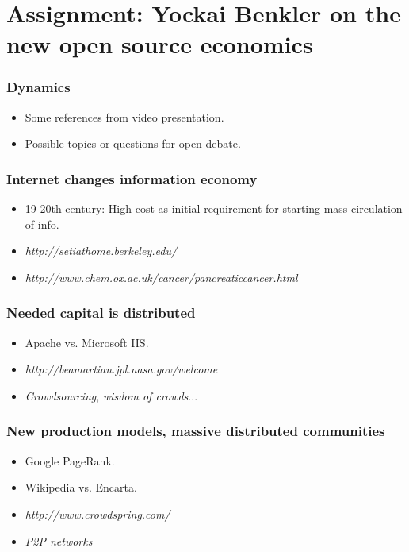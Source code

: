 \section{Assignment: Yockai Benkler on the new open source economics}

\begin{frame}
\frametitle{Dynamics}
\begin{itemize}
\item Some references from video presentation.
\item Possible topics or questions for open debate.
\end{itemize}
\end{frame}


\begin{frame}
 \frametitle{Internet changes information economy}
 \begin{itemize}
  \item 19-20th century: High cost as initial requirement for starting mass circulation of info.
  \item \textit{http://setiathome.berkeley.edu/}
  \item \textit{http://www.chem.ox.ac.uk/cancer/pancreaticcancer.html}
 \end{itemize}


\end{frame}


\begin{frame}
 \frametitle{Needed capital is distributed}
 \begin{itemize}
  \item Apache vs. Microsoft IIS.
  \item \textit{http://beamartian.jpl.nasa.gov/welcome}
  \item \textit{Crowdsourcing}, \textit{wisdom of crowds}...
 \end{itemize}

\end{frame}


\begin{frame}
 \frametitle{New production models, massive distributed communities}
 \begin{itemize}
  \item Google PageRank.
  \item Wikipedia vs. Encarta.
  \item \textit{http://www.crowdspring.com/}
  \item \textit{P2P networks}
 \end{itemize}

\end{frame}

